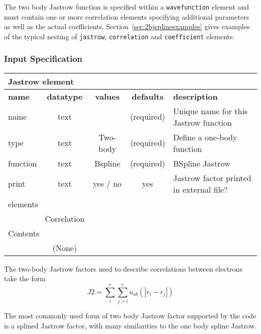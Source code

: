  The two body Jastrow function is specified within a \texttt{wavefunction} element
and must contain one or more correlation elements specifying additional parameters
as well as the actual coefficients.  Section~\ref{sec:2bjsplineexamples} gives 
examples of the typical nesting of \texttt{jastrow}, \texttt{correlation} and
\texttt{coefficient} elements.

\subsubsection{Input Specification}

\begin{table}[h]
\begin{center}
\begin{tabular}{l c c c l }
\hline
\multicolumn{5}{l}{Jastrow element} \\
\hline
\bfseries name & \bfseries datatype & \bfseries values & \bfseries defaults  & \bfseries description \\
\hline
name & text &    & (required) & Unique name for this Jastrow function \\
type & text & Two-body & (required) & Define a one-body function \\ 
function & text & Bspline & (required) & BSpline Jastrow \\
print & text & yes / no & yes & Jastrow factor printed in external file?\\
  \hline
\multicolumn{5}{l}{elements}\\ \hline
& Correlation & & & \\ \hline
\multicolumn{5}{l}{Contents}\\ \hline
& (None)  & & &  \\ \hline
\end{tabular}
\end{center}
\end{table}

The two-body Jastrow factors used to describe correlations between electrons take the form
\begin{equation}
J2=\sum_i^{e}\sum_{j>i}^{e} u_{ab}(|r_i-r_j|)
\end{equation}

The most commonly used form of two body Jastrow factor supported by the code is a splined
Jastrow factor, with many similarities to the one body spline Jastrow.



